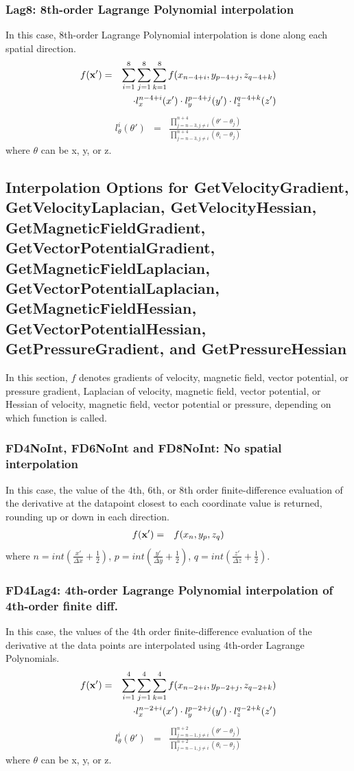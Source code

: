\documentclass[11pt]{article}
\def\bea{\begin{eqnarray}}
\def\eea{\end{eqnarray}}
\begin{document}
\subsubsection*{Lag8: 8th-order Lagrange Polynomial interpolation}

In this case, 8th-order Lagrange Polynomial interpolation is done along each spatial direction.
\bea f({\bf x'}) &=&
\sum_{i=1}^8\sum_{j=1}^8\sum_{k=1}^8f(x_{n-4+i},y_{p-4+j},z_{q-4+k})\nonumber\\
&&\cdot l_x^{n-4+i}(x')\cdot l_y^{p-4+j}(y')\cdot
l_z^{q-4+k}(z')\eea \bea l_\theta^i(\theta') &=&
\frac{\prod\limits_{j=n-3,j\neq
i}^{n+4}(\theta'-\theta_j)}{\prod\limits_{j=n-3,j\neq
i}^{n+4}(\theta_i-\theta_j)}\eea where $\theta$ can be x, y, or z.

\subsection{Interpolation Options for GetVelocityGradient, GetVelocityLaplacian, GetVelocityHessian, GetMagneticFieldGradient, GetVectorPotentialGradient,
 GetMagneticFieldLaplacian, GetVectorPotentialLaplacian, GetMagneticFieldHessian, GetVectorPotentialHessian, GetPressureGradient, and GetPressureHessian}

In this section, $f$ denotes gradients of velocity, magnetic field, vector potential, or pressure gradient,
Laplacian of velocity, magnetic field, vector potential, or Hessian of velocity, magnetic field, vector potential or pressure, depending on
which function is called.
\subsubsection*{FD4NoInt, FD6NoInt and FD8NoInt: No spatial  interpolation}

In this case, the value of the 4th, 6th, or 8th order finite-difference
evaluation of the derivative at the datapoint closest to each coordinate value is
returned, rounding up or down in each direction.
\bea f({\bf x'}) &=& f(x_n,y_p,z_q)\eea where
$n=int(\frac{x'}{\Delta x}+\frac{1}{2})$, $p=int(\frac{y'}{\Delta
y}+\frac{1}{2})$, $q=int(\frac{z'}{\Delta z}+\frac{1}{2})$.

\subsubsection*{FD4Lag4: 4th-order Lagrange Polynomial interpolation of 4th-order finite diff.}

In this case, the values of the 4th order finite-difference
evaluation of the derivative at the data points are interpolated using 4th-order Lagrange Polynomials.
\bea f({\bf x'}) &=&
\sum_{i=1}^4\sum_{j=1}^4\sum_{k=1}^4f(x_{n-2+i},y_{p-2+j},z_{q-2+k})\nonumber\\
&&\cdot l_x^{n-2+i}(x')\cdot l_y^{p-2+j}(y')\cdot
l_z^{q-2+k}(z')\eea \bea l_\theta^i(\theta') &=&
\frac{\prod\limits_{j=n-1,j\neq
i}^{n+2}(\theta'-\theta_j)}{\prod\limits_{j=n-1,j\neq
i}^{n+2}(\theta_i-\theta_j)}\eea where $\theta$ can be x, y, or z.
\end{document}
